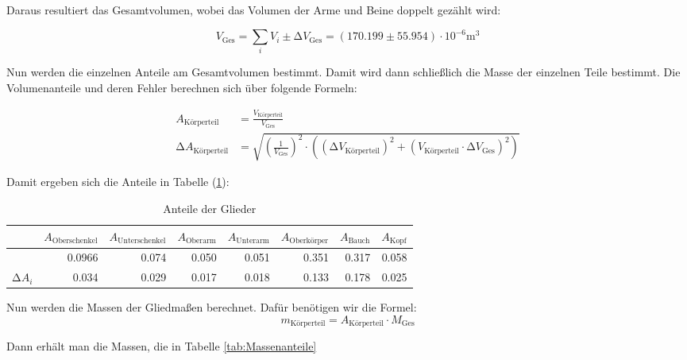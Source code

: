 Daraus resultiert das Gesamtvolumen, wobei das Volumen der Arme und Beine doppelt gezählt wird:

\begin{equation*}
  V_{\text{Ges}} = \sum_i V_{i} \pm  \increment V_{\text{Ges}}= (170.199 \pm 55.954) \cdot 10^{-6} \unit{\cubic\meter}
\end{equation*}

Nun werden die einzelnen Anteile am Gesamtvolumen bestimmt.
Damit wird dann schließlich die Masse der einzelnen Teile bestimmt.
Die Volumenanteile und deren Fehler berechnen sich über folgende Formeln:

\begin{align*}
  A_{\text{Körperteil}} & = \frac {V_{\text{Körperteil}}} {V_{\text{Ges}}} \\
  \increment A_{\text{Körperteil}} & = \sqrt{\left(\frac{1}{V_{\text{Ges}}}\right)^2 
  \cdot \left(\left( \increment V_{\text{Körperteil}} \right)^2 + \left( V_{\text{Körperteil}} 
  \cdot \increment V_{\text{Ges}} \right)^2\right)}
\end{align*}

Damit ergeben sich die Anteile in Tabelle (\ref{tab:AnteileKörper}):

\begin{table}
  \centering
  \caption{Anteile der Glieder}
  \label{tab:AnteileKörper}
  \begin{tabular}{rrrrrrrr}
    \toprule
      & $A_{\text{Oberschenkel}}$ &     $A_{\text{Unterschenkel}}$ &     $A_{\text{Oberarm}}$ &     $A_{\text{Unterarm}}$    &    $A_{\text{Oberkörper}}$ &     $A_{\text{Bauch}}$ & $A_{\text{Kopf}}$ \\
    \midrule
    & 0.0966 & 0.074 & 0.050 & 0.051 & 0.351 & 0.317 & 0.058 \\
    $\increment A_i$ & 0.034 & 0.029 & 0.017 & 0.018 & 0.133 & 0.178 & 0.025 \\
    \bottomrule
  \end{tabular}
\end{table}

Nun werden die Massen der Gliedmaßen berechnet. Dafür benötigen wir die Formel:
\begin{equation*}
  m_{\text{Körperteil}} = A_{\text{Körperteil}} \cdot M_{\text{Ges}}
\end{equation*}

Dann erhält man die Massen, die in Tabelle {\ref{tab:Massenanteile}}

